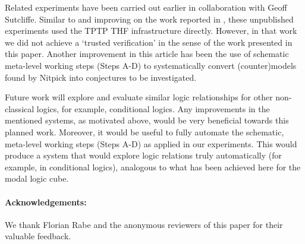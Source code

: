 \begin{isabellebody}
\begin{isamarkuptext}
Related experiments have been
carried out earlier in collaboration with Geoff Sutcliffe. Similar to
and improving on the
work reported in \cite{B12}, these unpublished experiments used the TPTP
THF infrastructure directly. However, in that work we did not achieve
a `trusted verification' in the sense of the work presented in this paper.
Another improvement in this article has been the use of schematic meta-level
working steps (Steps A-D) to systematically convert (counter)models found
by Nitpick into conjectures to be investigated. 

Future work will explore and evaluate similar logic relationships for other non-classical logics, for example, 
conditional logics. Any improvements in the mentioned systems, as motivated above, would be very beneficial
towards this planned work. Moreover, it would be useful to fully automate the schematic, meta-level working steps (Steps A-D) as
applied in our experiments. This would produce a system that would explore
logic relations truly automatically (for example, in conditional logics), analogous to what has been achieved here for the modal logic cube.%
\end{isamarkuptext}%
\isamarkuptrue%
%
\begin{isamarkuptext}%
\paragraph{Acknowledgements:} We thank Florian Rabe and the anonymous reviewers of this paper 
for their valuable feedback.%
\end{isamarkuptext}%
\isamarkuptrue%
%
\isadelimtheory
%
\endisadelimtheory
%
\isatagtheory
%
\endisatagtheory
{\isafoldtheory}%
%
\isadelimtheory
%
\endisadelimtheory
\end{isabellebody}%
